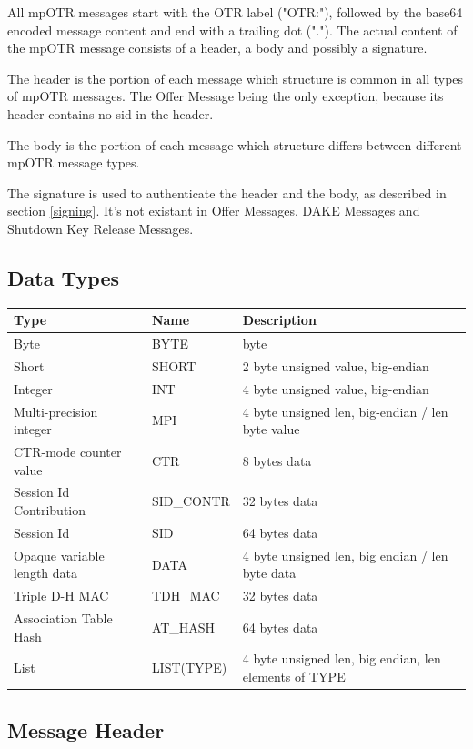 \documentclass[12pt,titlepage,a4paper]{article}
\begin{document}
All mpOTR messages start with the OTR label ("OTR:"), followed by the base64 encoded message content and end with a trailing dot ("."). The actual content of the mpOTR message consists of a header, a body and possibly a signature.

The header is the portion of each message which structure is common in all types of mpOTR messages. The Offer Message being the only exception, because its header contains no sid in the header.

The body is the portion of each message which structure differs between different mpOTR message types.

The signature is used to authenticate the header and the body, as described in section \ref{signing}. It's not existant in Offer Messages, DAKE Messages and Shutdown Key Release Messages.

\subsection{Data Types}
\begin{tabular}{l l l}
Type & Name & Description \\
\hline
Byte & BYTE & byte \\
Short & SHORT & 2 byte unsigned value, big-endian \\
Integer & INT & 4 byte unsigned value, big-endian \\
Multi-precision integer & MPI & 4 byte unsigned len, big-endian / len byte value \\
CTR-mode counter value & CTR & 8 bytes data \\
Session Id Contribution & SID\_CONTR & 32 bytes data \\
Session Id & SID & 64 bytes data \\
Opaque variable length data & DATA & 4 byte unsigned len, big endian / len byte data \\
Triple D-H MAC & TDH\_MAC & 32 bytes data \\
Association Table Hash & AT\_HASH & 64 bytes data \\
List & LIST(TYPE) & 4 byte unsigned len, big endian, len elements of TYPE \\
\end{tabular}

\subsection{Message Header}
\end{document}

